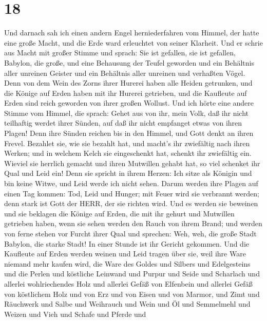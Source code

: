 \hypertarget{section-17}{%
\section{18}\label{section-17}}

 Und darnach sah ich einen andern Engel herniederfahren vom
Himmel, der hatte eine große Macht, und die Erde ward erleuchtet von
seiner Klarheit.  Und er schrie aus Macht mit großer Stimme
und sprach: Sie ist gefallen, sie ist gefallen, Babylon, die große, und
eine Behausung der Teufel geworden und ein Behältnis aller unreinen
Geister und ein Behältnis aller unreinen und verhaßten Vögel.
 Denn von dem Wein des Zorns ihrer Hurerei haben alle Heiden
getrunken, und die Könige auf Erden haben mit ihr Hurerei getrieben, und
die Kaufleute auf Erden sind reich geworden von ihrer großen Wollust.
 Und ich hörte eine andere Stimme vom Himmel, die sprach:
Gehet aus von ihr, mein Volk, daß ihr nicht teilhaftig werdet ihrer
Sünden, auf daß ihr nicht empfanget etwas von ihren Plagen! 
Denn ihre Sünden reichen bis in den Himmel, und Gott denkt an ihren
Frevel.  Bezahlet sie, wie sie bezahlt hat, und macht's ihr
zwiefältig nach ihren Werken; und in welchem Kelch sie eingeschenkt hat,
schenkt ihr zwiefältig ein.  Wieviel sie herrlich gemacht
und ihren Mutwillen gehabt hat, so viel schenket ihr Qual und Leid ein!
Denn sie spricht in ihrem Herzen: Ich sitze als Königin und bin keine
Witwe, und Leid werde ich nicht sehen.  Darum werden ihre
Plagen auf einen Tag kommen: Tod, Leid und Hunger; mit Feuer wird sie
verbrannt werden; denn stark ist Gott der HERR, der sie richten wird.
 Und es werden sie beweinen und sie beklagen die Könige auf
Erden, die mit ihr gehurt und Mutwillen getrieben haben, wenn sie sehen
werden den Rauch von ihrem Brand;  und werden von ferne
stehen vor Furcht ihrer Qual und sprechen: Weh, weh, die große Stadt
Babylon, die starke Stadt! In einer Stunde ist ihr Gericht gekommen.
 Und die Kaufleute auf Erden werden weinen und Leid tragen
über sie, weil ihre Ware niemand mehr kaufen wird,  die
Ware des Goldes und Silbers und Edelgesteins und die Perlen und
köstliche Leinwand und Purpur und Seide und Scharlach und allerlei
wohlriechendes Holz und allerlei Gefäß von Elfenbein und allerlei Gefäß
von köstlichem Holz und von Erz und von Eisen und von Marmor,
 und Zimt und Räuchwerk und Salbe und Weihrauch und Wein
und Öl und Semmelmehl und Weizen und Vieh und Schafe und Pferde und
